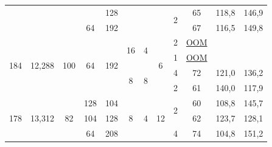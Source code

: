 \documentclass[11pt]{article}
\begin{document}
\begin{table}[h]
\begin{center}
\begin{small}
{\begin{tabular}{@{}cccccccccccc@{}}
                                  &                         &                      &                      & 128                   &                     &                    &                     & \multirow{2}{*}{2} & 65                 & 118,8                & 146,9            \\
                                  &                         &                      & 64                   & 192                   &                     &                    &                     &                    & 67                 & 116,5                & 149,8            \\\midrule
\multirow{4}{*}{184}              & \multirow{4}{*}{12,288} & \multirow{4}{*}{100} & \multirow{4}{*}{64}  & \multirow{4}{*}{192}  & \multirow{2}{*}{16} & \multirow{2}{*}{4} & \multirow{4}{*}{6}  & 2                  & \ul{OOM}           &                      &                  \\
                                  &                         &                      &                      &                       &                     &                    &                     & 1                  & \ul{OOM}           &                      &                  \\
                                  &                         &                      &                      &                       & \multirow{2}{*}{8}  & \multirow{2}{*}{8} &                     & 4                  & 72                 & 121,0                & 136,2            \\
                                  &                         &                      &                      &                       &                     &                    &                     & 2                  & 61                 & 140,0                & 117,9            \\\midrule
\multirow{5}{*}{178}              & \multirow{5}{*}{13,312} & \multirow{5}{*}{82}  & 128                  & 104                   & \multirow{3}{*}{8}  & \multirow{3}{*}{4} & \multirow{5}{*}{12} & \multirow{2}{*}{2} & 60                 & 108,8                & 145,7            \\
                                  &                         &                      & 104                  & 128                   &                     &                    &                     &                    & 62                 & 123,7                & 128,1            \\
                                  &                         &                      & \multirow{3}{*}{64}  & \multirow{3}{*}{208}  &                     &                    &                     & \multirow{2}{*}{4} & 74                 & 104,8                & 151,2            \\

\end{tabular}}
\end{small}
\end{center}
\end{table}
\end{document}
